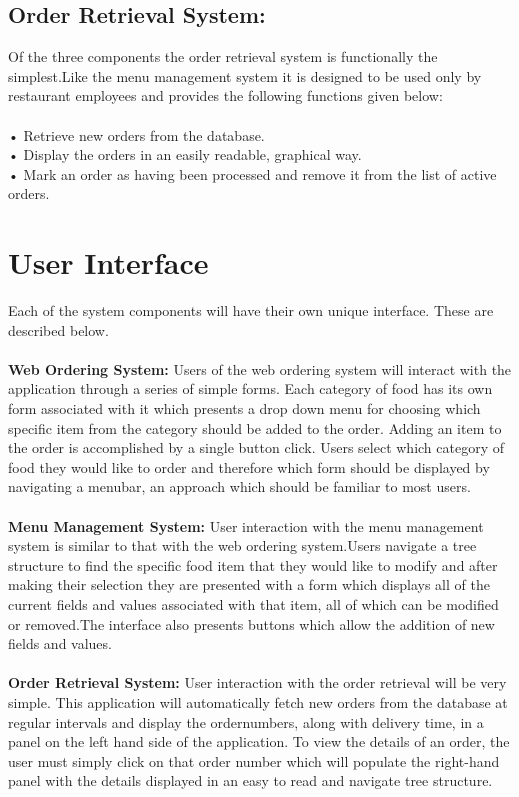 \documentclass{scrreprt}
\begin{document}
\subsection{Order Retrieval System:}

Of the three components the order retrieval system is functionally the simplest.Like the menu management system it is designed to be used only by restaurant employees and provides the following functions given below: \\ \\
• Retrieve new orders from the database. \\
• Display the orders in an easily readable, graphical way.\\
• Mark an order as having been processed and remove it from the list of active orders.\\
\section{User Interface}
Each of the system components will have their own unique interface. These are described below. \\  \\
\textbf{Web Ordering System:}
Users of the web ordering system will interact with the application through a series of simple forms. Each category of food has its own form associated with it which presents a drop down menu for choosing which specific item from the category should be added to the order. Adding an item to the order is accomplished by a single button click. Users select which category of food they would like to order and therefore which form should be displayed by navigating a menubar, an approach which should be familiar to most users. \\ \\
\textbf{Menu Management System:} 
User interaction with the menu management system is similar to that with the web ordering system.Users navigate a tree structure to find the specific food item that they would like to modify and after making their selection they are presented with a form which displays all of the current fields and values associated with that item, all of which can be modified or removed.The interface also presents buttons which allow the addition of new fields and values.\\ \\
\textbf{Order Retrieval System:}
User interaction with the order retrieval will be very simple. This application will automatically fetch new orders from the database at regular intervals and display the ordernumbers, along with delivery time, in a panel on the left hand side of the application. To view the details of an order, the user must simply click on that order number which will populate the right-hand panel with the details displayed in an easy to read and navigate tree structure. \\
\end{document}
